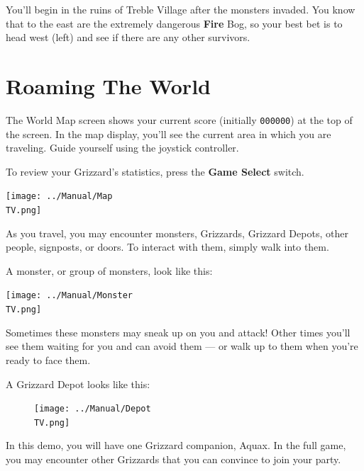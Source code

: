 \documentclass[10pt,twocolumn,openany,article]{memoir}
\newcommand\TV{NTSC}
\newcommand\TV{PAL}
\newcommand\TV{SECAM}
\begin{document}
\fi

You'll begin in the ruins of  Treble Village after the monsters invaded.
You know that to the east are  the extremely dangerous \textbf{Fire} Bog, so your
best  bet   is  to  head   west  (left)  and   see  if  there   are  any
other survivors.

\section{Roaming The World}

The   World   Map   screen   shows   your   current   score   (initially
\texttt{000000}) at  the top of the  screen. In the map  display, you'll
see the  current area in which  you are traveling. Guide  yourself using
the joystick controller.

To   review  your   Grizzard's   statistics,   press  the   \textbf{Game
  Select} switch.

\begin{center}
  \texttt{[image: ../Manual/Map\\TV.png]}
\end{center}

As   you  travel,   you   may  encounter   monsters,\ifdefined\DEMO\else
Grizzards,  \fi  Grizzard Depots,  other  people,  signposts, or  doors.
To interact with them, simply walk into them.

A  monster,  or group  of  monsters,  look  like this:

\begin{center}
  \texttt{[image: ../Manual/Monster\\TV.png]}
\end{center}

Sometimes these  monsters may sneak  up on  you and attack!  Other times
you'll see  them waiting for you  and can avoid  them --- or walk  up to
them when you're ready to face them.

A Grizzard Depot looks like this:

\begin{figure}[t]
  \begin{center}
    \texttt{[image: ../Manual/Depot\\TV.png]}
  \end{center}
\end{figure}

\ifdefined\DEMO
In this demo,  you will have one Grizzard companion,  Aquax. In the full
game, you  may encounter other Grizzards  that you can convince  to join
your party.
\end{document}
